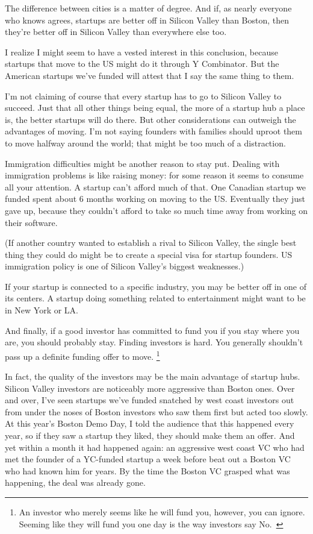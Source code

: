 The difference between cities is a matter of degree. And if, as nearly
everyone who knows agrees, startups are better off in Silicon Valley
than Boston, then they're better off in Silicon Valley than everywhere
else too.

I realize I might seem to have a vested interest in this conclusion,
because startups that move to the US might do it through Y Combinator.
But the American startups we've funded will attest that I say the same
thing to them.

I'm not claiming of course that every startup has to go to Silicon
Valley to succeed. Just that all other things being equal, the more of a
startup hub a place is, the better startups will do there. But other
considerations can outweigh the advantages of moving. I'm not saying
founders with families should uproot them to move halfway around the
world; that might be too much of a distraction.

Immigration difficulties might be another reason to stay put. Dealing
with immigration problems is like raising money: for some reason it
seems to consume all your attention. A startup can't afford much of
that. One Canadian startup we funded spent about 6 months working on
moving to the US. Eventually they just gave up, because they couldn't
afford to take so much time away from working on their software.

(If another country wanted to establish a rival to Silicon Valley, the
single best thing they could do might be to create a special visa for
startup founders. US immigration policy is one of Silicon Valley's
biggest weaknesses.)

If your startup is connected to a specific industry, you may be better
off in one of its centers. A startup doing something related to
entertainment might want to be in New York or LA.

And finally, if a good investor has committed to fund you if you stay
where you are, you should probably stay. Finding investors is hard. You
generally shouldn't pass up a definite funding offer to move.
\footnote{An investor who merely seems like he will fund you, however, you
can ignore. Seeming like they will fund you one day is the way investors
say No.~}

In fact, the quality of the investors may be the main advantage of
startup hubs. Silicon Valley investors are noticeably more aggressive
than Boston ones. Over and over, I've seen startups we've funded
snatched by west coast investors out from under the noses of Boston
investors who saw them first but acted too slowly. At this year's Boston
Demo Day, I told the audience that this happened every year, so if they
saw a startup they liked, they should make them an offer. And yet within
a month it had happened again: an aggressive west coast VC who had met
the founder of a YC-funded startup a week before beat out a Boston VC
who had known him for years. By the time the Boston VC grasped what was
happening, the deal was already gone.

